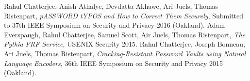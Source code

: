 \renewcommand\refname{{\large Publications}}
\begin{thebibliography}{0}
  Rahul Chatterjee, Anish Athalye, Devdatta Akhawe, Ari Juels, Thomas
  Ristenpart, \textit{pASSWORD tYPOS and How to Correct Them Securely}, Submitted
  to 37th IEEE Symposium on Security and Privacy 2016 (Oakland).
  Adam Everspaugh, Rahul Chatterjee, Samuel Scott, Air Juels, Thomas
  Ristenpart, \textit{The Pythia PRF Service}, USENIX Security 2015.
  Rahul Chatterjee, Joseph Bonneau, Ari Juels, Thomas Ristenpart,
  \textit{Cracking-Resistant Password Vaults using Natural Language Encoders},
  36th IEEE Symposium on Security and Privacy 2015 (Oakland).
\end{thebibliography}


